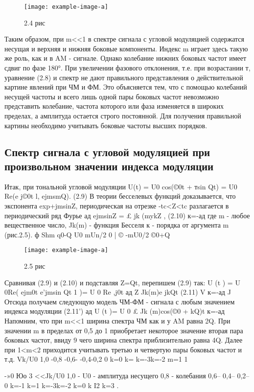 ﻿\documentclass[a4paper,12pt]{article}
\begin{document}
\begin{figure}[H]
	\centering
	\texttt{[image: example-image-a]}
	\caption{2.4 рис}
\end{figure}
Таким образом, при m<<1 в спектре сигнала с угловой модуляцией содержатся несущая и верхняя и нижняя боковые компоненты. Индекс m играет здесь такую же роль, как и в AM - сигнале.
Однако колебание нижних боковых частот имеет сдвиг по фазе 180°. При увеличении фазового отклонения, т.е. при возрастании т, уравнение (2.8) и спектр не дают правильного представления
о действительной картине явлений при ЧМ и ФМ. Это объясняется тем, что с помощью колебаний несущей частоты и всего лишь одной пары боковых частот невозможно представить колебание, частота которого или фаза изменяется в широких пределах, а амплитуда остается строго постоянной. Для получения правильной картины необходимо учитывать боковые частоты высших порядков.

\subsection{Спектр сигнала с угловой модуляцией при произвольном значении индекса модуляции}
Итак, при тональной угловой модуляции
U(t) = U0 cos(©0t + тsin Qt) = U0 Re(e j©0t l, ejmsmQ).	(2.9)
В теории бесселевых функций доказывается, что экспонента exp{+jmsinZ}, периодическая на отрезке -tc<Z<tc разлагается в периодический ряд Фурье
ад
ejmsinZ = £ jk (mykZ ,	(2.10)
к=-ад
где m - любое вещественное число, Jk(m) - функция Бесселя к - порядка от аргумента m (рис.2.5).
ф Shm
q0-Q
U0
mUn/2
0 | ©
-mU0/2
©0+Q

\begin{figure}[H]
	\centering
	\texttt{[image: example-image-a]}
	\caption{2.5 рис}
\end{figure}
Сравнивая (2.9) и (2.10) и подставляя Z=Qt, перепишем (2.9) так:
U (t ) = U 0Re(
ejm0t e'jmsin Qt 1
)= U 0 Re
,j0t
ад
Z Jk(m)e
jkQt
(2.11)
V	к=-ад	J
Отсюда получаем следующую модель ЧМ-ФМ - сигнала с любым значением индекса модуляции
(2.11’)
ад
U (t )= U 0 £ Jk (m)cos(©0 + kQ)t
к=-ад
Напомним, что при m<<1 ширина спектра ЧМ как и у AM равна 2Q. При значении m в пределах от 0,5 до 1 приобретает некоторое значение вторая пара боковых частот, ввиду
9
чего ширина спектра приблизительно равна 4Q. Далее при 1<m<2 приходится учитывать третью и четвертую пары боковых частот и т.д.
Vk/U0
1,0 -0,8 -0,6- -0,4-0,2
0
k=0
k=
k=-3k=-2
m=1
1

-»0
Юо
3
<<Jk/U0
1,0 -	U0 - амплитуда несущего
0,8 -	колебания
0,6--
0,4--
0,2--
0
k=-1	k=1
k=-3k=-2	k=0	k I2 k=3 .
		
\end{document}
